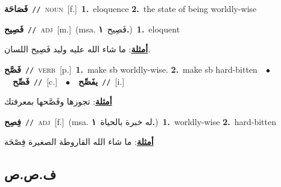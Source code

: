 \documentclass[10pt,a4paper,twoside]{article} %
\begin{document}
\begin{multicols}{2}
{\setlength\topsep{0pt}\textbf{\foreignlanguage{arabic}{فَصَاحَة}}\ {\color{gray}\texttt{//}\color{black}}\ \textsc{noun}\ [f.]\ \textbf{1.}~eloquence  \textbf{2.}~the state of being worldly-wise\ } \vspace{2mm}

{\setlength\topsep{0pt}\textbf{\foreignlanguage{arabic}{فَصِيح}}\ {\color{gray}\texttt{//}\color{black}}\ \textsc{adj}\ [m.]\ \color{gray}(msa. \foreignlanguage{arabic}{فَصِيح}~\foreignlanguage{arabic}{\textbf{١.}})\color{black}\ \textbf{1.}~eloquent\  \begin{flushright}\color{gray}\foreignlanguage{arabic}{\textbf{\underline{\foreignlanguage{arabic}{أمثلة}}}: ما شاء الله عليه وليد فَصِيح اللسان.}\end{flushright}\color{black}} \vspace{2mm}

{\setlength\topsep{0pt}\textbf{\foreignlanguage{arabic}{فَصَّح}}\ {\color{gray}\texttt{//}\color{black}}\ \textsc{verb}\ [p.]\ \textbf{1.}~make sb worldly-wise.  \textbf{2.}~make sb hard-bitten\ \ $\bullet$\ \ \setlength\topsep{0pt}\textbf{\foreignlanguage{arabic}{فَصِّح}}\ {\color{gray}\texttt{//}\color{black}}\ [c.]\ \ $\bullet$\ \ \setlength\topsep{0pt}\textbf{\foreignlanguage{arabic}{يفَصِّح}}\ {\color{gray}\texttt{//}\color{black}}\ [i.]\  \begin{flushright}\color{gray}\foreignlanguage{arabic}{\textbf{\underline{\foreignlanguage{arabic}{أمثلة}}}: تجوزها وفَصَّحها بمعرفتك}\end{flushright}\color{black}} \vspace{2mm}

{\setlength\topsep{0pt}\textbf{\foreignlanguage{arabic}{فِصِح}}\ {\color{gray}\texttt{//}\color{black}}\ \textsc{adj}\ [f.]\ \color{gray}(msa. \foreignlanguage{arabic}{له خبرة بالحياة}~\foreignlanguage{arabic}{\textbf{١.}})\color{black}\ \textbf{1.}~worldly-wise  \textbf{2.}~hard-bitten\  \begin{flushright}\color{gray}\foreignlanguage{arabic}{\textbf{\underline{\foreignlanguage{arabic}{أمثلة}}}: ما شاء الله القاروطة الصغيرة فِصْحَة}\end{flushright}\color{black}} \vspace{2mm}

\vspace{-3mm}
\subsection*{\color{blue}\foreignlanguage{arabic}{ف.ص.ص}\color{blue}{}} 


\end{multicols}
\end{document}
